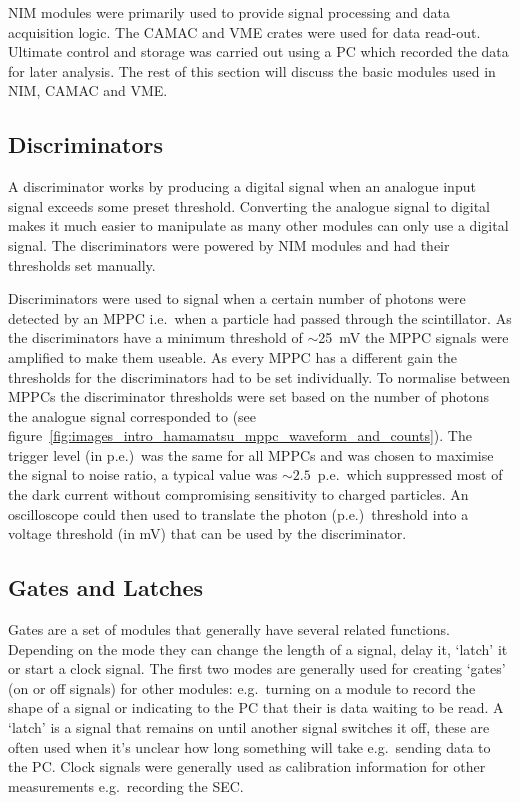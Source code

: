 NIM modules were primarily used to provide signal processing and data acquisition logic. The CAMAC and VME crates were used for data read-out. Ultimate control and storage was carried out using a PC which recorded the data for later analysis. The rest of this section will discuss the basic modules used in NIM, CAMAC and VME.
\subsection{Discriminators} %
\label{ssub:discriminators}
A discriminator works by producing a digital signal when an analogue input signal exceeds some preset threshold. Converting the analogue signal to digital makes it much easier to manipulate as many other modules can only use a digital signal. The discriminators were powered by NIM modules and had their thresholds set manually.

Discriminators were used to signal when a certain number of photons were detected by an MPPC i.e.\ when a particle had passed through the scintillator. As the discriminators have a minimum threshold of \(\sim\)25~mV the MPPC signals were amplified to make them useable. As every MPPC has a different gain the thresholds for the discriminators had to be set individually. To normalise between MPPCs the discriminator thresholds were set based on the number of photons the analogue signal corresponded to (see figure~\ref{fig:images_intro_hamamatsu_mppc_waveform_and_counts}). The trigger level (in p.e.)\ was the same for all MPPCs and was chosen to maximise the signal to noise ratio, a typical value was \(\sim2.5\)~p.e.\ which suppressed most of the dark current without compromising sensitivity to charged particles. An oscilloscope could then used to translate the photon (p.e.)\ threshold into a voltage threshold (in mV) that can be used by the discriminator.


\subsection{Gates and Latches} %
\label{ssub:gates}
Gates are a set of modules that generally have several related functions. Depending on the mode they can change the length of a signal, delay it, `latch' it or start a clock signal. The first two modes are generally used for creating `gates' (on or off signals) for other modules: e.g.\ turning on a module to record the shape of a signal or indicating to the PC that their is data waiting to be read. A `latch' is a signal that remains on until another signal switches it off, these are often used when it's unclear how long something will take e.g.\ sending data to the PC. Clock signals were generally used as calibration information for other measurements e.g.\ recording the SEC.

